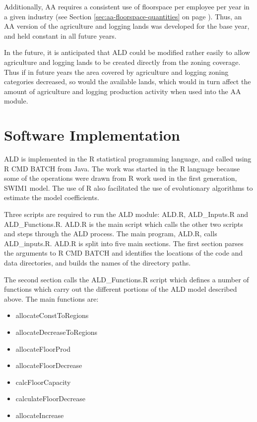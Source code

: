 Additionally, AA requires a consistent use of floorspace per employee per year in a given industry (see Section \ref{sec:aa-floorspace-quantities} on page \pageref{sec:aa-floorspace-quantities}). Thus, an AA version of the agriculture and logging lands was developed for the base year, and held constant in all future years. 

In the future, it is anticipated that ALD could be modified rather easily to allow agriculture and logging lands to be created directly from the zoning coverage. Thus if in future years the area covered by agriculture and logging zoning categories decreased, so would the available lands, which would in turn affect the amount of agriculture and logging production activity when used into the AA module. 

\section{Software Implementation}
ALD is implemented in the R statistical programming language, and called using R CMD BATCH from Java. %
The work was started in the R language because some of the operations were drawn from R work used in the first generation, SWIM1 model. The use of R also facilitated the use of evolutionary algorithms to estimate the model coefficients.

Three scripts are required to run the ALD module: ALD.R, ALD\_Inputs.R and ALD\_Functions.R. ALD.R is the main script which calls the other two scripts and steps through the ALD process. The main program, ALD.R, calls ALD\_inputs.R. ALD.R is split into five main sections. The first section parses the arguments to R CMD BATCH and identifies the locations of the code and data directories, and builds the names of the directory paths. 

The second section calls the ALD\_Functions.R script which defines a number of functions which carry out the different portions of the ALD model described above. The main functions are:
\begin{itemize}
\item allocateConstToRegions
\item allocateDecreaseToRegions
\item allocateFloorProd
\item allocateFloorDecrease
\item calcFloorCapacity
\item calculateFloorDecrease
\item allocateIncrease
\end{itemize}

